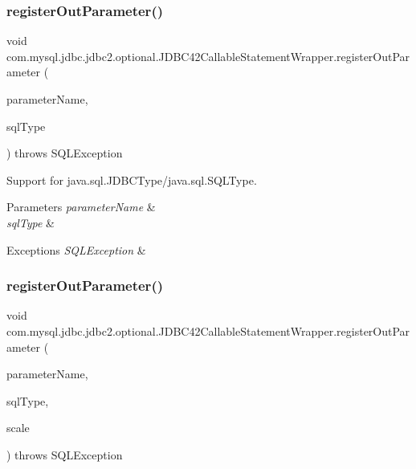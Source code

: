 \subsubsection{\texorpdfstring{register\+Out\+Parameter()}{registerOutParameter()}\hspace{0.1cm}{\footnotesize\ttfamily [4/6]}}
{\footnotesize\ttfamily void com.\+mysql.\+jdbc.\+jdbc2.\+optional.\+J\+D\+B\+C42\+Callable\+Statement\+Wrapper.\+register\+Out\+Parameter (\begin{DoxyParamCaption}\item[{String}]{parameter\+Name,  }\item[{S\+Q\+L\+Type}]{sql\+Type }\end{DoxyParamCaption}) throws S\+Q\+L\+Exception}

Support for java.\+sql.\+J\+D\+B\+C\+Type/java.sql.\+S\+Q\+L\+Type.


\begin{DoxyParams}{Parameters}
{\em parameter\+Name} & \\
\hline
{\em sql\+Type} & \\
\hline
\end{DoxyParams}

\begin{DoxyExceptions}{Exceptions}
{\em S\+Q\+L\+Exception} & \\
\hline
\end{DoxyExceptions}
\mbox{\label{classcom_1_1mysql_1_1jdbc_1_1jdbc2_1_1optional_1_1_j_d_b_c42_callable_statement_wrapper_a477132d86c0829be4ba36d219efaf5ff}} 
\subsubsection{\texorpdfstring{register\+Out\+Parameter()}{registerOutParameter()}\hspace{0.1cm}{\footnotesize\ttfamily [5/6]}}
{\footnotesize\ttfamily void com.\+mysql.\+jdbc.\+jdbc2.\+optional.\+J\+D\+B\+C42\+Callable\+Statement\+Wrapper.\+register\+Out\+Parameter (\begin{DoxyParamCaption}\item[{String}]{parameter\+Name,  }\item[{S\+Q\+L\+Type}]{sql\+Type,  }\item[{int}]{scale }\end{DoxyParamCaption}) throws S\+Q\+L\+Exception}

